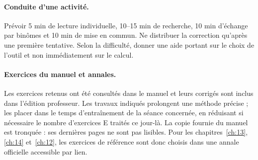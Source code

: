 \paragraph{Conduite d'une activité.} Prévoir 5 min de lecture individuelle, 10--15 min de recherche, 10 min d'échange par binômes et 10 min de mise en commun. Ne distribuer la correction qu'après une première tentative. Selon la difficulté, donner une aide portant sur le choix de l'outil et non immédiatement sur le calcul.
\paragraph{Exercices du manuel et annales.} Les exercices retenus ont été consultés dans le manuel et leurs corrigés sont inclus dans l'édition professeur. Les travaux indiqués prolongent une méthode précise ; les placer dans le temps d'entraînement de la séance concernée, en réduisant si nécessaire le nombre d'exercices E traités ce jour-là. La copie fournie du manuel est tronquée : ses dernières pages ne sont pas lisibles. Pour les chapitres~\ref{ch:13}, \ref{ch:14} et~\ref{ch:12}, les exercices de référence sont donc choisis dans une annale officielle accessible par lien.
